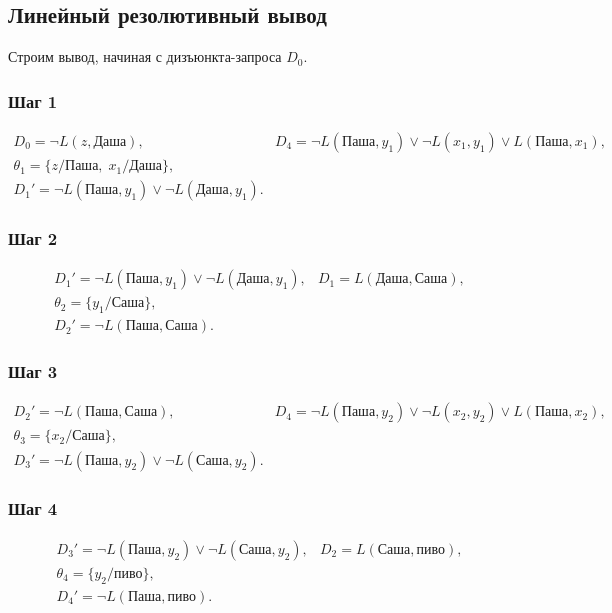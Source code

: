 \documentclass[10pt]{article}
\begin{document}
\subsection*{Линейный резолютивный вывод}
Строим вывод, начиная с дизъюнкта-запроса $D_0$.

\subsubsection*{Шаг 1}
\[
\begin{array}{ll}
D_0 = \neg L(z, \text{Даша}), & D_4 = \neg L(\text{Паша}, y_1) \lor \neg L(x_1, y_1) \lor L(\text{Паша}, x_1), \\
\theta_1 = \{z / \text{Паша},\; x_1 / \text{Даша}\}, & \\
D_1' = \neg L(\text{Паша}, y_1) \lor \neg L(\text{Даша}, y_1). &
\end{array}
\]

\subsubsection*{Шаг 2}
\[
\begin{array}{ll}
D_1' = \neg L(\text{Паша}, y_1) \lor \neg L(\text{Даша}, y_1), & D_1 = L(\text{Даша}, \text{Саша}), \\
\theta_2 = \{y_1 / \text{Саша}\}, & \\
D_2' = \neg L(\text{Паша}, \text{Саша}). &
\end{array}
\]

\subsubsection*{Шаг 3}
\[
\begin{array}{ll}
D_2' = \neg L(\text{Паша}, \text{Саша}), & D_4 = \neg L(\text{Паша}, y_2) \lor \neg L(x_2, y_2) \lor L(\text{Паша}, x_2), \\
\theta_3 = \{x_2 / \text{Саша}\}, & \\
D_3' = \neg L(\text{Паша}, y_2) \lor \neg L(\text{Саша}, y_2). &
\end{array}
\]

\subsubsection*{Шаг 4}
\[
\begin{array}{ll}
D_3' = \neg L(\text{Паша}, y_2) \lor \neg L(\text{Саша}, y_2), & D_2 = L(\text{Саша}, \text{пиво}), \\
\theta_4 = \{y_2 / \text{пиво}\}, & \\
D_4' = \neg L(\text{Паша}, \text{пиво}). &
\end{array}
\]
\end{document}
